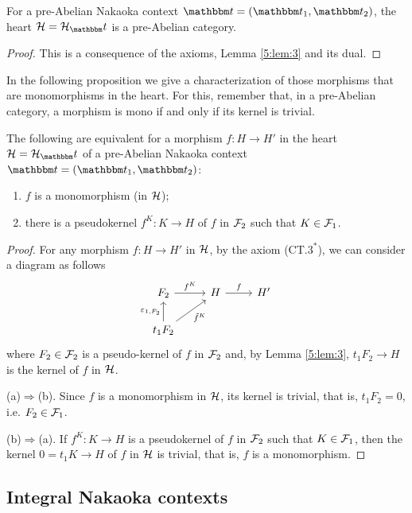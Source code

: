 \begin{thm}\label{pre_abelian_theorem}
For a pre-Abelian Nakaoka context $\t=(\t_1,\t_2)$, the heart $\clH=\clH_\t$ is a pre-Abelian category.
\end{thm}
\begin{proof}
This is a consequence of the axioms, Lemma \ref{5:lem:3} and its dual.
\end{proof}

In the following proposition we give a characterization of those morphisms that are monomorphisms in the heart. For this, remember that, in a pre-Abelian category, a morphism is mono if and only if its kernel is trivial.

\begin{prop}\label{prop:1.4}
  The following are equivalent for a morphism $f\colon H\to H'$ in the heart $\clH=\clH_\t$ of a pre-Abelian Nakaoka context $\t=(\t_1,\t_2)$:
  \begin{enumerate}[label=(\alph*)]
    \item $f$ is a monomorphism (in $\mathcal{H}$);
    \item there is a pseudokernel $f^K\colon K\to H$ of $f$ in $\mathcal{F}_2$ such that $K\in \mathcal{F}_1$.
  \end{enumerate}
\end{prop}
\begin{proof}
  For any morphism $f\colon H\to H'$ in $\mathcal{H}$, by the axiom (CT.$3^*$), we can consider a diagram as follows
  \begin{equation*}
    \begin{tikzcd}
      F_2\arrow{r}{f^K} & H\arrow{r}{f} & H'\\
      t_1{F_2}\arrow{u}{\varepsilon_{1,F_2}}\arrow{ur}[']{\tilde{f}^K}
    \end{tikzcd}
  \end{equation*}
  where $F_2\in \mathcal{F}_2$ is a pseudo-kernel of $f$ in $\mathcal{F}_2$ and, by Lemma \ref{5:lem:3}, $t_1F_2\to H$ is the kernel of $f$ in $\mathcal{H}$.

  \smallskip\noindent
  (a)$\Rightarrow$(b). Since $f$ is a monomorphism in $\mathcal{H}$, its kernel is trivial, that is, $t_1F_2=0$, i.e. $F_2\in \mathcal{F}_1$.

  \smallskip\noindent
  (b)$\Rightarrow$(a). If  $f^K\colon K\to H$ is a pseudokernel of $f$ in $\mathcal{F}_2$ such that $K\in \mathcal{F}_1$, then the kernel $0=t_1K\to H$ of $f$ in $\mathcal{H}$ is trivial, that is, $f$ is a monomorphism.
\end{proof}

\subsection{Integral Nakaoka contexts}

